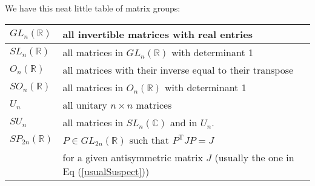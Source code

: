 We have this neat little table of matrix groups:
\begin{center}
  \begin{tabular}{ | l | l | }
\hline
$GL_{n}(\mathbb{R})$ & all invertible matrices with real entries \\ \hline
$SL_{n}(\mathbb{R})$ & all matrices in $GL_{n}(\mathbb{R})$ with determinant 1 \\ \hline
$O_{n}(\mathbb{R})$ & all matrices with their inverse equal to their transpose \\ \hline
$SO_{n}(\mathbb{R})$ & all matrices in $O_{n}(\mathbb{R})$ with determinant 1 \\ \hline
$U_{n}$ & all unitary $n\times n$ matrices \\ \hline
$SU_{n}$ & all matrices in $SL_{n}(\mathbb{C})$ and in $U_{n}$. \\ \hline
$SP_{2n}(\mathbb{R})$ & $P\in GL_{2n}(\mathbb{R})$ such that $P^\textrm{T}JP = J$\\
 & for a given antisymmetric matrix $J$ (usually the one in Eq (\ref{usualSuspect})) \\ \hline
  \end{tabular}
\end{center} 
